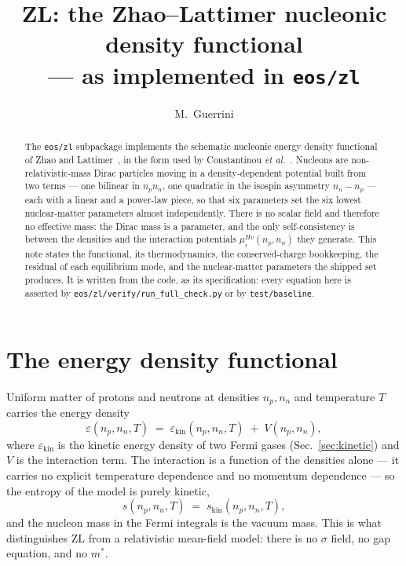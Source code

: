 \documentclass[aps,prc,onecolumn,superscriptaddress,nofootinbib,10pt]{revtex4-2}
\newcommand{\muHv}[1]{\mu^{Hv}_{#1}}
\begin{document}
\title{ZL: the Zhao--Lattimer nucleonic density functional \\
       --- as implemented in \texttt{eos/zl}}

\author{M.~Guerrini}

\begin{abstract}
The \texttt{eos/zl} subpackage implements the schematic nucleonic energy
density functional of Zhao and Lattimer~\cite{ZhaoLattimer2020}, in the form
used by Constantinou \textit{et
al.}~\cite{Constantinou2021,Constantinou2023,Constantinou2025}. Nucleons are
non-relativistic-mass Dirac particles moving in a density-dependent potential
built from two terms --- one bilinear in $n_p n_n$, one quadratic in the
isospin asymmetry $n_n - n_p$ --- each with a linear and a power-law piece, so
that six parameters set the six lowest nuclear-matter parameters almost
independently. There is no scalar field and therefore no effective mass: the
Dirac mass is a parameter, and the only self-consistency is between the
densities and the interaction potentials $\muHv{i}(n_p, n_n)$ they generate.
This note states the functional, its thermodynamics, the conserved-charge
bookkeeping, the residual of each equilibrium mode, and the nuclear-matter
parameters the shipped set produces. It is written from the code, as its
specification: every equation here is asserted by
\texttt{eos/zl/verify/run\_full\_check.py} or by \texttt{test/baseline}.
\end{abstract}

\maketitle

\section{The energy density functional}
\label{sec:functional}

Uniform matter of protons and neutrons at densities $n_p, n_n$ and temperature
$T$ carries the energy density
%
\begin{equation}
\varepsilon(n_p, n_n, T) \;=\; \varepsilon_{\mathrm{kin}}(n_p, n_n, T)
   \;+\; V(n_p, n_n) ,
\label{eq:eps}
\end{equation}
%
where $\varepsilon_{\mathrm{kin}}$ is the kinetic energy density of two Fermi
gases (Sec.~\ref{sec:kinetic}) and $V$ is the interaction term. The
interaction is a function of the densities alone --- it carries no explicit
temperature dependence and no momentum dependence --- so the entropy of the
model is purely kinetic,
%
\begin{equation}
s(n_p, n_n, T) \;=\; s_{\mathrm{kin}}(n_p, n_n, T) ,
\label{eq:entropy}
\end{equation}
%
and the nucleon mass in the Fermi integrals is the vacuum mass. This is what
distinguishes ZL from a relativistic mean-field model: there is no
$\sigma$ field, no gap equation, and no $m^*$.
\end{document}
